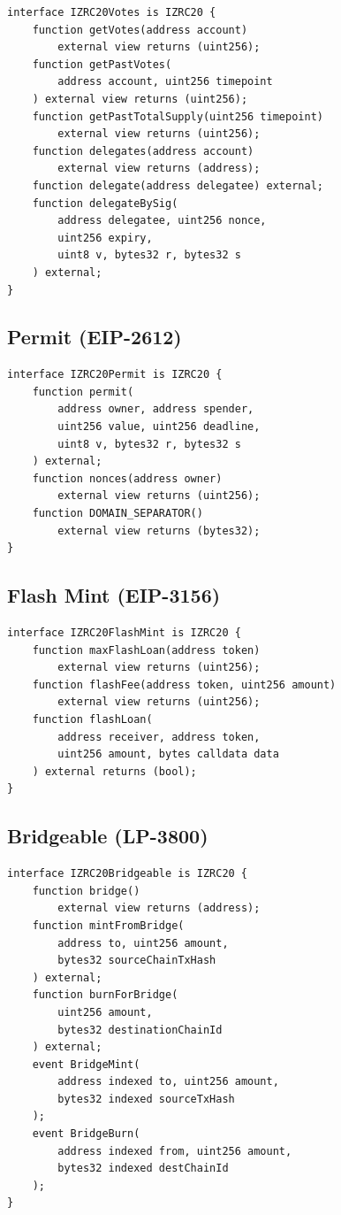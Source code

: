\documentclass[11pt,letterpaper]{article}
\begin{document}
\begin{lstlisting}[language=Solidity,caption=IZRC20Votes]
interface IZRC20Votes is IZRC20 {
    function getVotes(address account)
        external view returns (uint256);
    function getPastVotes(
        address account, uint256 timepoint
    ) external view returns (uint256);
    function getPastTotalSupply(uint256 timepoint)
        external view returns (uint256);
    function delegates(address account)
        external view returns (address);
    function delegate(address delegatee) external;
    function delegateBySig(
        address delegatee, uint256 nonce,
        uint256 expiry,
        uint8 v, bytes32 r, bytes32 s
    ) external;
}
\end{lstlisting}

\subsection{Permit (EIP-2612)}

\begin{lstlisting}[language=Solidity,caption=IZRC20Permit]
interface IZRC20Permit is IZRC20 {
    function permit(
        address owner, address spender,
        uint256 value, uint256 deadline,
        uint8 v, bytes32 r, bytes32 s
    ) external;
    function nonces(address owner)
        external view returns (uint256);
    function DOMAIN_SEPARATOR()
        external view returns (bytes32);
}
\end{lstlisting}

\subsection{Flash Mint (EIP-3156)}

\begin{lstlisting}[language=Solidity,caption=IZRC20FlashMint]
interface IZRC20FlashMint is IZRC20 {
    function maxFlashLoan(address token)
        external view returns (uint256);
    function flashFee(address token, uint256 amount)
        external view returns (uint256);
    function flashLoan(
        address receiver, address token,
        uint256 amount, bytes calldata data
    ) external returns (bool);
}
\end{lstlisting}

\subsection{Bridgeable (LP-3800)}

\begin{lstlisting}[language=Solidity,caption=IZRC20Bridgeable]
interface IZRC20Bridgeable is IZRC20 {
    function bridge()
        external view returns (address);
    function mintFromBridge(
        address to, uint256 amount,
        bytes32 sourceChainTxHash
    ) external;
    function burnForBridge(
        uint256 amount,
        bytes32 destinationChainId
    ) external;
    event BridgeMint(
        address indexed to, uint256 amount,
        bytes32 indexed sourceTxHash
    );
    event BridgeBurn(
        address indexed from, uint256 amount,
        bytes32 indexed destChainId
    );
}
\end{lstlisting}
\end{document}
